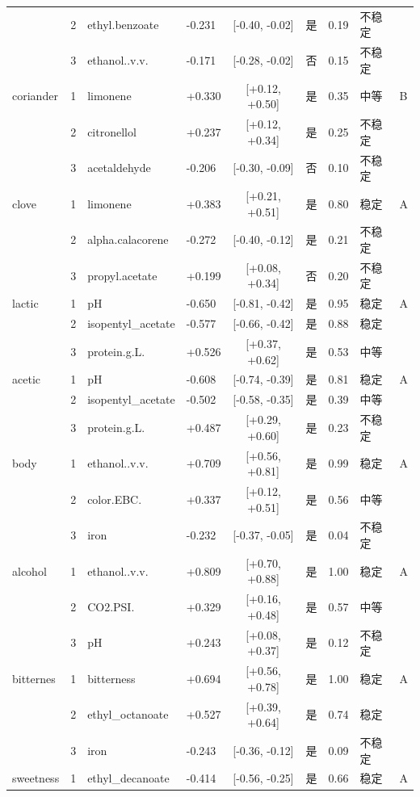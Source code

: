 \begin{longtable}{llllcccll}
 & 2 & ethyl.benzoate & -0.231 & [-0.40, -0.02] & 是 & 0.19 & 不稳定 &  \\
 & 3 & ethanol..v.v. & -0.171 & [-0.28, -0.02] & 否 & 0.15 & 不稳定 &  \\
coriander & 1 & limonene & +0.330 & [+0.12, +0.50] & 是 & 0.35 & 中等 & B \\
 & 2 & citronellol & +0.237 & [+0.12, +0.34] & 是 & 0.25 & 不稳定 &  \\
 & 3 & acetaldehyde & -0.206 & [-0.30, -0.09] & 否 & 0.10 & 不稳定 &  \\
clove & 1 & limonene & +0.383 & [+0.21, +0.51] & 是 & 0.80 & 稳定 & A \\
 & 2 & alpha.calacorene & -0.272 & [-0.40, -0.12] & 是 & 0.21 & 不稳定 &  \\
 & 3 & propyl.acetate & +0.199 & [+0.08, +0.34] & 否 & 0.20 & 不稳定 &  \\
lactic & 1 & pH & -0.650 & [-0.81, -0.42] & 是 & 0.95 & 稳定 & A \\
 & 2 & isopentyl\_acetate & -0.577 & [-0.66, -0.42] & 是 & 0.88 & 稳定 &  \\
 & 3 & protein.g.L. & +0.526 & [+0.37, +0.62] & 是 & 0.53 & 中等 &  \\
acetic & 1 & pH & -0.608 & [-0.74, -0.39] & 是 & 0.81 & 稳定 & A \\
 & 2 & isopentyl\_acetate & -0.502 & [-0.58, -0.35] & 是 & 0.39 & 中等 &  \\
 & 3 & protein.g.L. & +0.487 & [+0.29, +0.60] & 是 & 0.23 & 不稳定 &  \\
body & 1 & ethanol..v.v. & +0.709 & [+0.56, +0.81] & 是 & 0.99 & 稳定 & A \\
 & 2 & color.EBC. & +0.337 & [+0.12, +0.51] & 是 & 0.56 & 中等 &  \\
 & 3 & iron & -0.232 & [-0.37, -0.05] & 是 & 0.04 & 不稳定 &  \\
alcohol & 1 & ethanol..v.v. & +0.809 & [+0.70, +0.88] & 是 & 1.00 & 稳定 & A \\
 & 2 & CO2.PSI. & +0.329 & [+0.16, +0.48] & 是 & 0.57 & 中等 &  \\
 & 3 & pH & +0.243 & [+0.08, +0.37] & 是 & 0.12 & 不稳定 &  \\
bitternes & 1 & bitterness & +0.694 & [+0.56, +0.78] & 是 & 1.00 & 稳定 & A \\
 & 2 & ethyl\_octanoate & +0.527 & [+0.39, +0.64] & 是 & 0.74 & 稳定 &  \\
 & 3 & iron & -0.243 & [-0.36, -0.12] & 是 & 0.09 & 不稳定 &  \\
sweetness & 1 & ethyl\_decanoate & -0.414 & [-0.56, -0.25] & 是 & 0.66 & 稳定 & A \\

\end{longtable}
